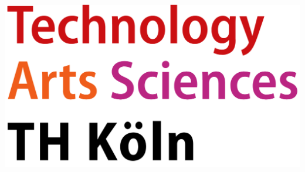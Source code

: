 \documentclass[
12pt, %
oneside, %
english, %
onehalfspacing, %
liststotoc, %
JumpToContents, %
parskip, %
headsepline, %
]{MastersDoctoralThesis} %
\author{Lu \textsc{Knoblich}, Christian \textsc{Schmitz}}
\begin{document}
\frontmatter %



\pagestyle{plain} %




\begin{titlepage}
    
    
\iftrue
\begin{center}

\includegraphics[scale=0.075]{Figures/logo-thk.png}\\[1.9cm]




\end{center}
\end{titlepage}
\end{document}
